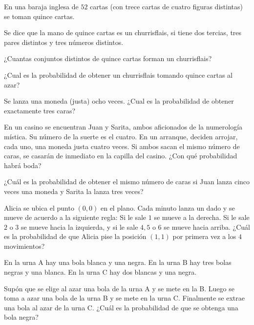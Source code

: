 \begin{ejercicio} 
En una baraja inglesa de $52$ cartas (con trece cartas de cuatro figuras distintas) se toman quince cartas.

Se dice que la mano de quince cartas es un churrisflais, si tiene dos tercias, tres pares distintos y tres números distintos.

¿Cuantas conjuntos distintos de quince cartas forman un churrisflais?

¿Cual es la probabilidad de obtener un churrisflais tomando quince cartas al azar?



\end{ejercicio}
\vspace{4cm}

\begin{ejercicio} 
Se lanza una moneda (justa) ocho veces. ¿Cual es la probabilidad de obtener exactamente tres caras?
\end{ejercicio}
\vspace{4cm}

\begin{ejercicio} 
En un casino se encuentran Juan y Sarita, ambos aficionados de la numerología mística. Su número de la suerte es el cuatro. En un arranque, deciden arrojar, cada uno, una moneda justa cuatro veces. Si ambos sacan el mismo número de caras, se casarán de inmediato en la capilla del casino. ¿Con qué probabilidad habrá boda?
\end{ejercicio}
\vspace{4cm}

\begin{ejercicio} 
¿Cuál es la probabilidad de obtener el mismo número de caras si Juan lanza cinco veces una moneda y Sarita la lanza tres veces?
\end{ejercicio}
\vspace{4cm}

\begin{ejercicio} 
Alicia se ubica el punto $(0,0)$ en el plano. Cada minuto lanza un dado y se mueve de acuerdo a la siguiente regla: Si le sale $1$ se mueve a la derecha. Si le sale $2$ o $3$ se mueve hacia la izquierda, y si le sale $4,5$ o $6$ se mueve hacia arriba. ¿Cuál es la probabilidad de que Alicia pise la posición $(1,1)$ por primera vez a los $4$ movimientos? 
\end{ejercicio}
\vspace{4cm}


\begin{ejercicio} 
En la urna A hay una bola blanca y una negra. En la urna B hay tres bolas negras y una blanca. En la urna C hay dos blancas y una negra.

Supón que se elige al azar una bola de la urna A y se mete en la B. Luego se toma a azar una bola de la urna B y se mete en la urna C. Finalmente se extrae una bola al azar de la urna C. ¿Cuál es la probabilidad de que se obtenga una bola negra?
\end{ejercicio}
\vspace{4cm}

